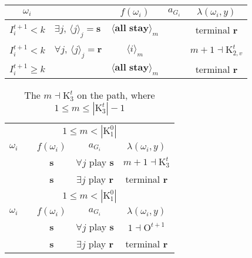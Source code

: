 \documentclass[12pt,letter]{article}
\newcommand{\Kappa}{\mathrm{K}}
\newcommand{\Omicron}{\mathrm{O}}
\theoremstyle{definition}
\theoremstyle{remark}
\theoremstyle{claim}
\begin{document}
\begin{table}[!htbp]
\begin{center}
\begin{tabular}{c l | c | c | c}
$\omega_i$ 	 & 	   &	$f(\omega_i)$  &	$a_{G_i}$ & $\lambda(\omega_i,y)$ \\
\hline
\hline
$I^{t+1}_i< k$  	& 	$\exists j$, $\langle j \rangle_j=\textbf{s}$	& $\langle \textbf{all stay} \rangle_m$		&  	& terminal \textbf{r}\\
$I^{t+1}_i< k$  	& 	$\forall j$, $\langle j \rangle_j=\textbf{r}$	& $\langle i \rangle_m$		&  	& $m+1\dashv \Kappa^t_{2,v}$\\
$I^{t+1}_i\geq k$	 & 				& $\langle \textbf{all stay} \rangle_m$ 	& 		& terminal \textbf{r}\\
\hline
\end{tabular}
\end{center}
\end{table}




\clearpage









\begin{table}[!htbp]
\caption{The $m\dashv\Kappa^t_{3}$ on the path, where $1\leq m \leq |\Kappa^t_3|-1$}
\begin{center}
\begin{tabular}{c c | c | c | c}
\multicolumn{5}{c}{$1\leq m < |\Kappa^0_1|$}\\
$\omega_i$ 	 & 	   &	$f(\omega_i)$  &	$a_{G_i}$ & $\lambda(\omega_i,y)$ \\
\hline
\hline
  	&	& \textbf{s} & $\forall j$ play $\textbf{s}$ 	& $m+1\dashv \Kappa^t_{3}$\\
  	&  & \textbf{s}  &  $\exists j$ play $\textbf{r}$  	& terminal \textbf{r}\\
\hline
\multicolumn{5}{c}{$1\leq m < |\Kappa^0_1|$}\\
$\omega_i$ 	 & 	   &	$f(\omega_i)$  &	$a_{G_i}$ & $\lambda(\omega_i,y)$ \\
\hline
\hline
 	& 	& \textbf{s} & $\forall j$ play $\textbf{s}$ 	& $1\dashv \Omicron^{t+1}$\\
  	&  & \textbf{s}  &  $\exists j$ play $\textbf{r}$  	& terminal \textbf{r}\\
\hline
\end{tabular}
\end{center}
\end{table}




\clearpage
\end{document}
